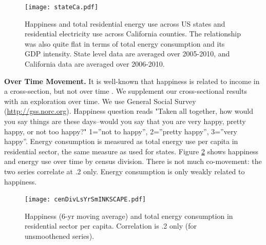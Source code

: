 \documentclass[10pt, letterpaper]{article}
\begin{document}
\begin{spacing}{1.5}
\begin{figure}[H]
 \texttt{[image: stateCa.pdf]}\centering
\caption{Happiness and total residential energy use across US states and
  residential electricity use across   
  California counties.  %
 The relationship was also quite flat in terms of total energy consumption and
 its GDP intensity. State level data are averaged over 2005-2010, and California data are averaged over 2006-2010.
}\label{stateCaPAP}
 \end{figure} %

{\bf Over Time Movement.} It is well-known that happiness is related to income
in  a 
cross-section, but not over time \citep{easterlin74,easterlin12}. We
supplement our cross-sectional results with an exploration over time. We use General
Social Survey (\url{http://gss.norc.org}).   %
Happiness question reads "Taken all together, how would you say things are
      these days--would you say that you are very happy, pretty happy, or not
      too happy?" 1=''not to happy'', 2=''pretty happy'', 3=''very happy''. 
 Energy consumption is measured as total energy use per capita in
residential sector, the same measure as used for states. 
Figure \ref{cenDivLsYrSm} shows happiness and energy use over time by
census division. There is not much co-movement: the two series correlate at
.2 only. Energy consumption is only weakly related to happiness. 

\begin{figure}[H]
 \texttt{[image: cenDivLsYrSmINKSCAPE.pdf]}\centering
\caption{Happiness (6-yr moving average) and total energy consumption
  in residential sector per capita. Correlation is .2 only (for unsmoothened series).
}\label{cenDivLsYrSm}
\end{figure}


\end{spacing}
\end{document}
